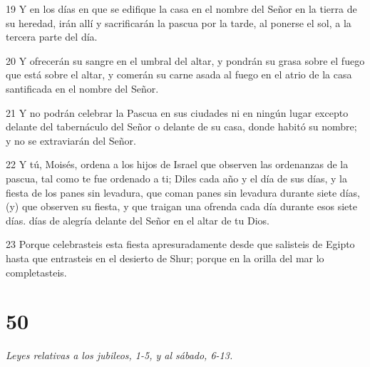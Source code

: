 \par 19 Y en los días en que se edifique la casa en el nombre del Señor en la tierra de su heredad, irán allí y sacrificarán la pascua por la tarde, al ponerse el sol, a la tercera parte del día.
\par 20 Y ofrecerán su sangre en el umbral del altar, y pondrán su grasa sobre el fuego que está sobre el altar, y comerán su carne asada al fuego en el atrio de la casa santificada en el nombre del Señor.
\par 21 Y no podrán celebrar la Pascua en sus ciudades ni en ningún lugar excepto delante del tabernáculo del Señor o delante de su casa, donde habitó su nombre; y no se extraviarán del Señor.
\par 22 Y tú, Moisés, ordena a los hijos de Israel que observen las ordenanzas de la pascua, tal como te fue ordenado a ti; Diles cada año y el día de sus días, y la fiesta de los panes sin levadura, que coman panes sin levadura durante siete días, (y) que observen su fiesta, y que traigan una ofrenda cada día durante esos siete días. días de alegría delante del Señor en el altar de tu Dios.
\par 23 Porque celebrasteis esta fiesta apresuradamente desde que salisteis de Egipto hasta que entrasteis en el desierto de Shur; porque en la orilla del mar lo completasteis.

\chapter{50}

\par \textit{Leyes relativas a los jubileos, 1-5, y al sábado, 6-13.}

